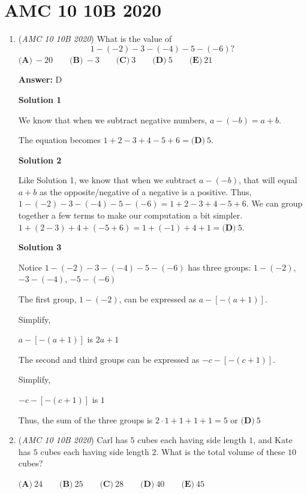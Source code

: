\section{AMC 10 10B 2020}
        \begin{enumerate}
        	\item (\textit{AMC 10 10B 2020}) What is the value of 
 \[1 - (-2) - 3 - (-4) - 5 - (-6)?\]
$\textbf{(A)}\ -20 \qquad\textbf{(B)}\ -3 \qquad\textbf{(C)}\ 3 \qquad\textbf{(D)}\ 5 \qquad\textbf{(E)}\ 21$

 \textbf{Answer: }D



\textbf{Solution 1}

We know that when we subtract negative numbers, $a-(-b)=a+b$.

 The equation becomes $1+2-3+4-5+6 = \boxed{\textbf{(D)}\ 5}$.

 



\textbf{Solution 2}

Like Solution 1, we know that when we subtract $a-(-b)$, that will equal $a+b$ as the opposite/negative of a negative is a positive. Thus, $1-(-2)-3-(-4)-5-(-6)=1+2-3+4-5+6$. We can group together a few terms to make our computation a bit simpler. $1+(2-3)+4+(-5+6)= 1+(-1)+4+1=\boxed{\textbf{(D)}\ 5}$.

 



\textbf{Solution 3}

Notice $1-(-2)-3-(-4)-5-(-6)$ has three groups: $1-(-2)$, $-3-(-4)$, $-5-(-6)$

 The first group, $1-(-2)$, can be expressed as $a-[-(a+1)]$.

 Simplify, 

 $a-[-(a+1)]$ is $2a+1$

 The second and third groups can be expressed as $-c-[-(c+1)]$.

 Simplify,

 $-c-[-(c+1)]$ is $1$

 Thus, the sum of the three groups is $2 \cdot 1 + 1 + 1 + 1 = 5$ or $\boxed{\textbf{(D)}\ 5}$



	\item (\textit{AMC 10 10B 2020}) Carl has $5$ cubes each having side length $1$, and Kate has $5$ cubes each having side length $2$. What is the total volume of these $10$ cubes?


 $\textbf{(A)}\ 24 \qquad\textbf{(B)}\ 25 \qquad\textbf{(C)}\ 28 \qquad\textbf{(D)}\ 40 \qquad\textbf{(E)}\ 45$


\end{enumerate}
